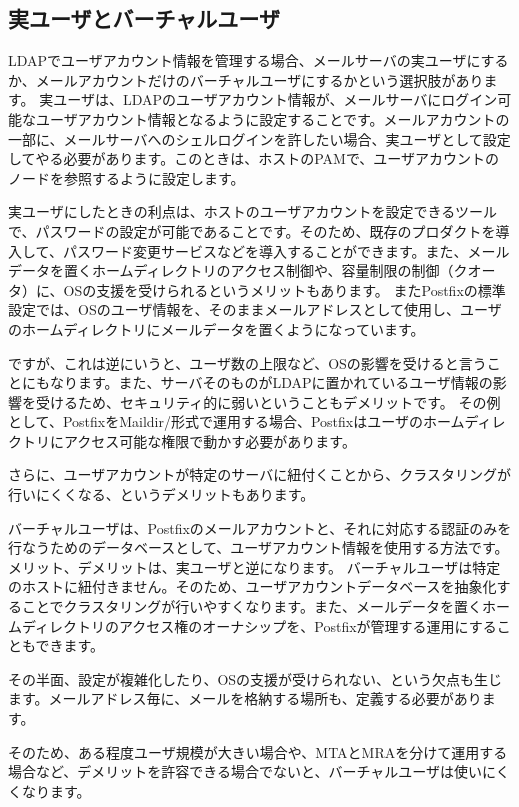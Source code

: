 \subsection{実ユーザとバーチャルユーザ}

LDAPでユーザアカウント情報を管理する場合、メールサーバの実ユーザにするか、メールアカウントだけのバーチャルユーザにするかという選択肢があります。
実ユーザは、LDAPのユーザアカウント情報が、メールサーバにログイン可能なユーザアカウント情報となるように設定することです。メールアカウントの一部に、メールサーバへのシェルログインを許したい場合、実ユーザとして設定してやる必要があります。このときは、ホストのPAMで、ユーザアカウントのノードを参照するように設定します。

実ユーザにしたときの利点は、ホストのユーザアカウントを設定できるツールで、パスワードの設定が可能であることです。そのため、既存のプロダクトを導入して、パスワード変更サービスなどを導入することができます。また、メールデータを置くホームディレクトリのアクセス制御や、容量制限の制御（クオータ）に、OSの支援を受けられるというメリットもあります。
またPostfixの標準設定では、OSのユーザ情報を、そのままメールアドレスとして使用し、ユーザのホームディレクトリにメールデータを置くようになっています。

ですが、これは逆にいうと、ユーザ数の上限など、OSの影響を受けると言うことにもなります。また、サーバそのものがLDAPに置かれているユーザ情報の影響を受けるため、セキュリティ的に弱いということもデメリットです。
その例として、PostfixをMaildir/形式で運用する場合、Postfixはユーザのホームディレクトリにアクセス可能な権限で動かす必要があります。

さらに、ユーザアカウントが特定のサーバに紐付くことから、クラスタリングが行いにくくなる、というデメリットもあります。


バーチャルユーザは、Postfixのメールアカウントと、それに対応する認証のみを行なうためのデータベースとして、ユーザアカウント情報を使用する方法です。メリット、デメリットは、実ユーザと逆になります。
バーチャルユーザは特定のホストに紐付きません。そのため、ユーザアカウントデータベースを抽象化することでクラスタリングが行いやすくなります。また、メールデータを置くホームディレクトリのアクセス権のオーナシップを、Postfixが管理する運用にすることもできます。

その半面、設定が複雑化したり、OSの支援が受けられない、という欠点も生じます。メールアドレス毎に、メールを格納する場所も、定義する必要があります。

そのため、ある程度ユーザ規模が大きい場合や、MTAとMRAを分けて運用する場合など、デメリットを許容できる場合でないと、バーチャルユーザは使いにくくなります。


